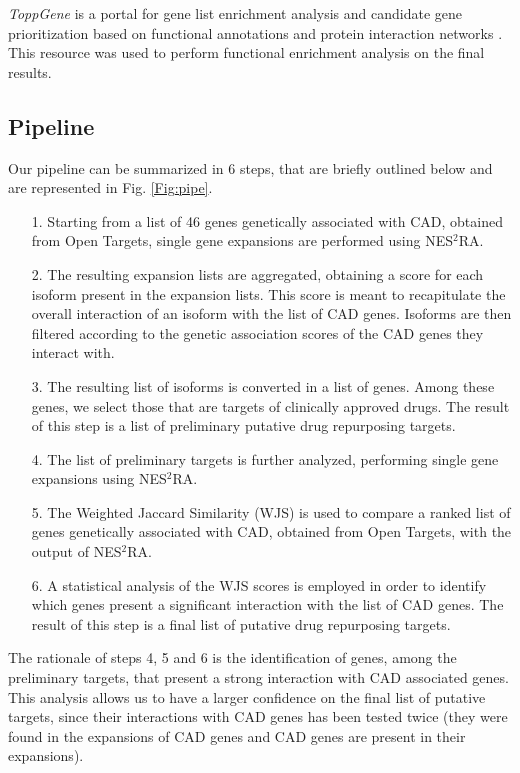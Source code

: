 \documentclass[fleqn,10pt]{SelfArx} %
\begin{document}
\emph{ToppGene} is a portal for gene list enrichment analysis and candidate gene prioritization based on functional annotations and protein interaction networks \cite{toppgene}. This resource was used to perform functional enrichment analysis on the final results.

\subsection*{Pipeline}

Our pipeline can be summarized in  6 steps, that are briefly outlined below and are represented in Fig. \ref{Fig:pipe}.

\begin{itemize}[leftmargin=*]
	\item[1.] Starting from a list of 46 genes genetically associated with CAD, obtained from Open Targets, single gene expansions are performed using NES$^2$RA.
	\item[2.] The resulting expansion lists are aggregated, obtaining a score for each isoform present in the expansion lists. This score is meant to recapitulate the overall interaction of an isoform with the list of CAD genes. Isoforms are then filtered according to the genetic association scores of the CAD genes they interact with.
	\item[3.] The resulting list of isoforms is converted in a list of genes. Among these genes, we select those that are targets of clinically approved drugs. The result of this step is a list of preliminary putative drug repurposing targets.
	\item[4.] The list of preliminary targets is further analyzed, performing single gene expansions using NES$^2$RA.
	\item[5.] The Weighted Jaccard Similarity (WJS) \cite{WGS} is used to compare a ranked list of genes genetically associated with CAD, obtained from Open Targets, with the output of NES$^2$RA.
	\item[6.] A statistical analysis of the WJS scores is employed in order to identify which genes present a significant interaction with the list of CAD genes. The result of this step is a final list of putative drug repurposing targets.
\end{itemize}

The rationale of steps 4, 5 and 6 is the identification of genes, among the preliminary targets, that present a strong interaction with CAD associated genes. This analysis allows us to have a larger confidence on the final list of putative targets, since their interactions with CAD genes has been tested twice (they were found in the expansions of CAD genes and CAD genes are present in their expansions).
\end{document}

